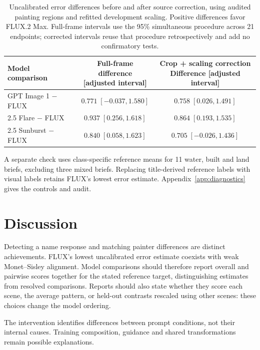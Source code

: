 \begin{table}[!htbp]
\caption{Uncalibrated error differences before and after source correction, using audited painting regions and refitted development scaling. Positive differences favor FLUX.2 Max. Full-frame intervals use the 95\% simultaneous procedure across 21 endpoints; corrected intervals reuse that procedure retrospectively and add no confirmatory tests.}
\label{tab:source-comparison}
\centering\small
\begin{tabularx}{\linewidth}{@{}Xcc@{}}\toprule
Model comparison & \shortstack{Full-frame difference\\{[adjusted interval]}} & \shortstack{Crop + scaling correction\\Difference [adjusted interval]}\\\midrule
GPT Image 1 $-$ FLUX & $0.771\;[-0.037,1.580]$ & $0.758\;[0.026,1.491]$\\[2pt]
2.5 Flare $-$ FLUX & $0.937\;[0.256,1.618]$ & $0.864\;[0.193,1.535]$\\[2pt]
2.5 Sunburst $-$ FLUX & $0.840\;[0.058,1.623]$ & $0.705\;[-0.026,1.436]$\\[2pt]
\bottomrule\end{tabularx}

\end{table}



A separate check uses class-specific reference means for 11 water, built and
land briefs, excluding three mixed briefs. Replacing title-derived reference
labels with visual labels retains FLUX's lowest error estimate.
Appendix~\ref{app:diagnostics} gives the controls and audit.\par



\section{Discussion}\label{sec:discussion}
Detecting a name response and matching painter differences are distinct achievements.
FLUX's lowest uncalibrated error estimate coexists with weak Monet--Sisley alignment.
Model comparisons should therefore report overall and pairwise scores together
for the stated reference target, distinguishing estimates from resolved comparisons.
Reports should also state whether they score each scene, the average pattern,
or held-out contrasts rescaled using other scenes: these choices change the model ordering.

The intervention identifies differences between prompt conditions, not their
internal causes. Training composition, guidance and shared transformations remain
possible explanations.

